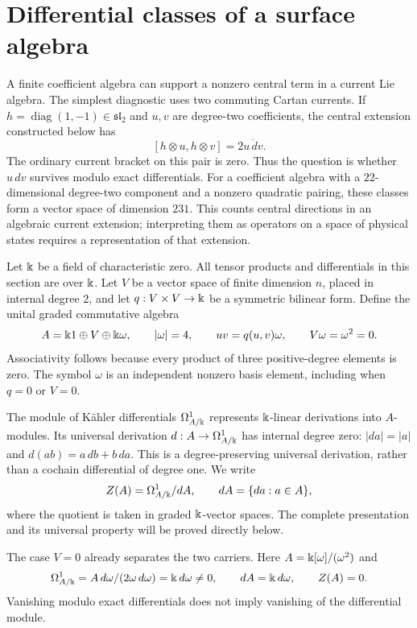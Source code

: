 \section{Differential classes of a surface algebra}
\label{ce:surface}

A finite coefficient algebra can support a nonzero central term in a
current Lie algebra.  The simplest diagnostic uses two commuting Cartan
currents.  If $h=\operatorname{diag}(1,-1)\in\mathfrak{sl}_2$ and $u,v$
are degree-two coefficients, the central extension constructed below has
\[
 [h\otimes u,h\otimes v]=2\overline{u\,dv}.
\]
The ordinary current bracket on this pair is zero.  Thus the question is
whether $u\,dv$ survives modulo exact differentials.  For a coefficient
algebra with a $22$-dimensional degree-two component and a nonzero
quadratic pairing, these classes form a vector space of dimension $231$.
This counts central directions in an algebraic current
extension; interpreting them as operators on a space of physical states
requires a representation of that extension.

Let $\Bbbk$ be a field of characteristic zero.  All tensor products and
differentials in this section are over $\Bbbk$.  Let $V$ be a vector space of
finite dimension $n$, placed in internal degree $2$, and let
$q:V\times V\to \Bbbk$ be a symmetric bilinear form.  Define the unital graded
commutative algebra
\begin{equation}\label{ce:algebra}
 A=\Bbbk1\oplus V\oplus \Bbbk\omega,\qquad
 |\omega|=4,\qquad uv=q(u,v)\omega,\qquad V\omega=\omega^2=0.
\end{equation}
Associativity follows because every product of three positive-degree
elements is zero.  The symbol $\omega$ is an independent nonzero basis
element, including when $q=0$ or $V=0$.

The module of K\"ahler differentials $\Omega^1_{A/\Bbbk}$ represents
$\Bbbk$-linear derivations into $A$-modules.  Its universal derivation
$d:A\to\Omega^1_{A/\Bbbk}$ has internal degree zero:
$|da|=|a|$ and $d(ab)=a\,db+b\,da$.  This is a degree-preserving
universal derivation, rather than a cochain differential of degree one.
We write
\begin{equation}\label{ce:quotient}
 Z(A)=\Omega^1_{A/\Bbbk}/dA,\qquad
 dA=\{da:a\in A\},
\end{equation}
where the quotient is taken in graded $\Bbbk$-vector spaces.  The complete
presentation and its universal property will be proved directly below.

The case $V=0$ already separates the two carriers.  Here
$A=\Bbbk[\omega]/(\omega^2)$ and
\[
 \Omega^1_{A/\Bbbk}=A\,d\omega/(2\omega\,d\omega)=\Bbbk\,d\omega\ne0,
 \qquad dA=\Bbbk\,d\omega,\qquad Z(A)=0.
\]
Vanishing modulo exact differentials does not imply vanishing of the
differential module.

